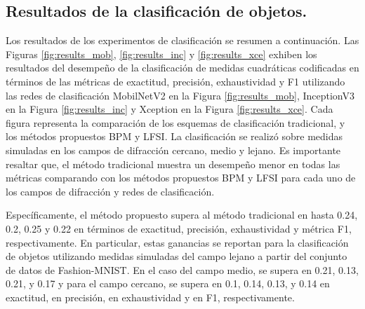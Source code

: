 \pagebreak

\subsection{Resultados de la clasificación de objetos.}

Los resultados de los experimentos de clasificación se resumen a continuación. Las Figuras \ref{fig:results_mob}, \ref{fig:results_inc} y \ref{fig:results_xce} exhiben los resultados del desempeño de la clasificación de medidas cuadráticas codificadas en términos de las métricas de exactitud, precisión, exhaustividad y F1 utilizando las redes de clasificación MobilNetV2 en la Figura \ref{fig:results_mob}, InceptionV3 en la Figura \ref{fig:results_inc} y Xception en la Figura \ref{fig:results_xce}. Cada figura representa la comparación de los esquemas de clasificación tradicional, y los métodos propuestos BPM y LFSI. La clasificación se realizó sobre medidas simuladas en los campos de difracción cercano, medio y lejano. Es importante resaltar que, el método tradicional muestra un desempeño menor en todas las métricas comparando con los métodos propuestos BPM y LFSI para cada uno de los campos de difracción y redes de clasificación.

Específicamente, el método propuesto supera al método tradicional en hasta 0.24, 0.2, 0.25 y 0.22 en términos de exactitud, precisión, exhaustividad y métrica F1, respectivamente. En particular, estas ganancias se reportan para la clasificación de objetos utilizando medidas simuladas del campo lejano a partir del conjunto de datos de Fashion-MNIST. En el caso del campo medio, se supera en 0.21, 0.13, 0.21, y 0.17 y para el campo cercano, se supera en 0.1, 0.14, 0.13, y 0.14 en exactitud, en precisión, en exhaustividad y en F1, respectivamente. 

